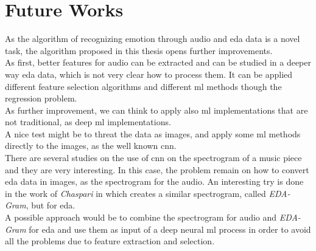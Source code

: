\section{Future Works}
As the algorithm of recognizing emotion through audio and \gls{eda} data is a novel task, the algorithm proposed in this thesis opens further improvements.
\\ \indent
As first, better features for audio can be extracted and can be studied in a deeper way \gls{eda} data, which is not very clear how to process them. It can be applied different feature selection algorithms and different \gls{ml} methods though the regression problem.
\\ \indent
As further improvement, we can think to apply also \gls{ml} implementations that are not traditional, as deep \gls{ml} implementations.
\\
A nice test might be to threat the data as images, and apply some \gls{ml} methods directly to the images, as the well known \gls{cnn}.
\\
There are several studies on the use of \gls{cnn} on the spectrogram of a music piece and they are very interesting. In this case, the problem remain on how to convert \gls{eda} data in images, as the spectrogram for the audio. An interesting try is done in the work of \textit{Chaspari} in \cite{chaspari2016eda} which creates a similar spectrogram, called \textit{EDA-Gram}, but for \gls{eda}.
\\
A possible approach would be to combine the spectrogram for audio and \textit{EDA-Gram} for \gls{eda} and use them as input of a deep neural \gls{ml} process in order to avoid all the problems due to feature extraction and selection.